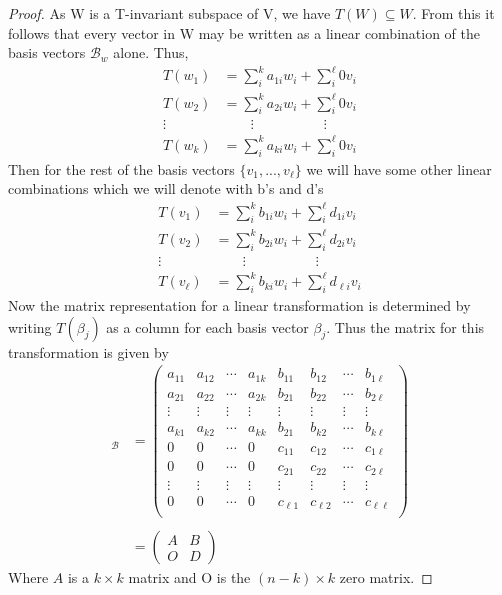 \documentclass[a4paper, 11pt]{article}
\newenvironment{solution}{%
	\begin{list}{}{%
			\setlength{\topsep}{0pt}%
			\setlength{\leftmargin}{1.5cm}%
			\setlength{\rightmargin}{1.5cm}%
			\setlength{\listparindent}{\parindent}%
			\setlength{\itemindent}{\parindent}%
			\setlength{\parsep}{\parskip}%
		}%
		\item[]}{\end{list}}
\begin{document}
\begin{solution}
\begin{proof}
			\noindent As W is a T-invariant subspace of V, we have $T(W)\subseteq W$. From this it follows that every vector in W may be written as a linear combination of the basis vectors $\mathcal{B}_w$ alone. Thus,
				\begin{align*}
					T(w_1) &= \sum_i^k a_{1i} w_i + \sum_i^\ell 0v_i \\ 
					T(w_2) &= \sum_i^k a_{2i} w_i + \sum_i^\ell 0v_i \\ 
					\vdots \qquad	& \qquad \vdots  \qquad \qquad \quad \vdots \\ 
					T(w_k) &= \sum_i^k a_{ki} w_i + \sum_i^\ell 0v_i 
				\end{align*}
			Then for the rest of the basis vectors $\{v_1, ... ,v_\ell\}$ we will have some other linear combinations which we will denote with b's and d's 
				\begin{align*}
					T(v_1) &= \sum_i^k b_{1i} w_i + \sum_i^\ell d_{1i}v_i \\ 
					T(v_2) &= \sum_i^k b_{2i} w_i + \sum_i^\ell d_{2i}v_i \\ 
					\vdots \qquad	& \qquad \vdots  \qquad \qquad \quad \vdots \\ 
					T(v_\ell) &= \sum_i^k b_{ki} w_i + \sum_i^\ell d_{\ell i}v_i 
				\end{align*}
			Now the matrix representation for a linear transformation is determined by writing $T(\beta_j)$ as a column for each basis vector $\beta_j$. Thus the matrix for this transformation is given by 
				\begin{align*}
					[T]_\mathcal{B} &= \begin{pmatrix}
						a_{11} & a_{12} & \cdots & a_{1k} & b_{11} & b_{12} & \cdots & b_{1\ell} \\ 
						a_{21} & a_{22} & \cdots & a_{2k} & b_{21} & b_{22} & \cdots & b_{2\ell} \\ 
						\vdots & \vdots & \vdots & \vdots & \vdots & \vdots & \vdots & \vdots \\ 
						a_{k1} & a_{k2} & \cdots & a_{kk} & b_{21} & b_{k2} & \cdots & b_{k\ell} \\
						0	   & 0		& \cdots & 0 	  & c_{11} & c_{12} & \cdots & c_{1\ell} \\
						0	   & 0		& \cdots & 0 	  & c_{21} & c_{22} & \cdots & c_{2\ell} \\
						\vdots & \vdots & \vdots & \vdots & \vdots & \vdots & \vdots & \vdots \\ 
						0	   & 0		& \cdots & 0 	  & c_{\ell1} & c_{\ell2} & \cdots & c_{\ell\ell} \\
					\end{pmatrix} \\ 
					& \\ 
					&= \begin{pmatrix}
						A & B \\ 
						O & D 
					\end{pmatrix}
				\end{align*}
			Where $A$ is a $k\times k$ matrix and O is the $(n-k)\times k$ zero matrix. 
		\end{proof}
	\end{solution}
\end{document}
